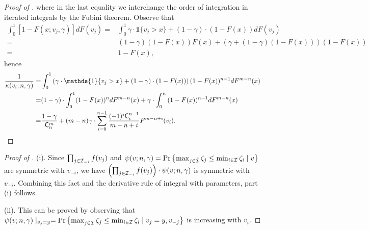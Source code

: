 \begin{proof}[Proof of ]
where in the last equality we interchange the order of integration in iterated integrals by the Fubini theorem. Observe that 
\begin{align*}
\int_0^1 [1-F(x;v_j,\gamma)]dF(v_j) = &\int_0^1 \gamma \cdot \mathds{1}\{v_j>x\} + (1-\gamma)\cdot (1-F(x))dF(v_j) \\
=&(1-\gamma)(1-F(x)) F(x) +\left(\gamma + (1-\gamma)(1-F(x))\right)(1-F(x))\\
=&1-F(x),
\end{align*}
hence 
\begin{align*}
\frac{1}{\kappa(v_i;n,\gamma)} =&   \int_0^1 \left(\gamma \cdot \mathds{1}\{v_j>x\} + (1-\gamma)\cdot (1-F(x))\right)(1-F(x))^{n-1}dF^{m-n}(x)\\
=& (1-\gamma)\cdot \int_0^1(1-F(x))^ndF^{m-n}(x) + \gamma \cdot \int_0^{v_i} (1-F(x))^{n-1}dF^{m-n}(x)\\
=& \frac{1-\gamma}{\C^m_n} + (m-n)\gamma \cdot \sum_{i=0}^{n-1}\frac{(-1)^i\C^{n-1}_i}{m-n+i} F^{m-n+i}(v_i).
\end{align*}
\end{proof}

\begin{proof}[Proof of ]
(i). Since $\prod_{j\in \mathcal{I}_{-i}} f(v_j)$ and $\psi(v;n,\gamma) = \Pr\left\{
\max_{j\in \Bar{\mathcal{I}}} \zeta_j \leq \min_{i\in \mathcal{I}}\zeta_i
\mid v\right\}$ are symmetric with $v_{-i}$, we have $\left(\prod_{j\in \mathcal{I}_{-i}} f(v_j)\right)
 \cdot 
\psi(v;n,\gamma)$ is symmetric with $v_{-i}$. Combining this fact and the derivative rule of integral with parameters, part (i) follows.

\noindent (ii). This can be proved by observing that $\psi(v;n,\gamma)\mid _{v_j = y} = \Pr\left\{
\max_{j\in \Bar{\mathcal{I}}} \zeta_j \leq \min_{i\in \mathcal{I}}\zeta_i
\mid v_j = y, v_{-j}\right\}$ is increasing with $v_i$.
\end{proof}

